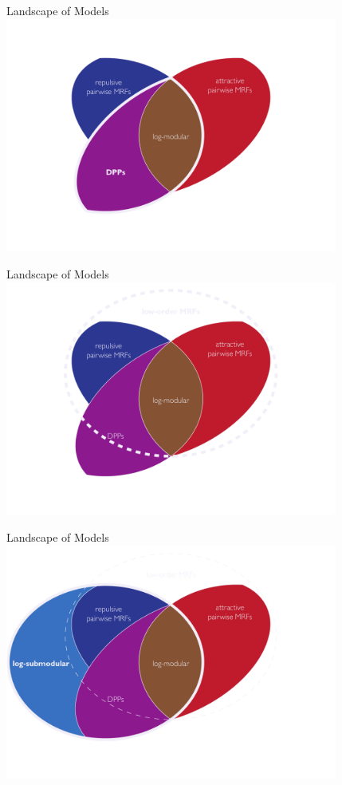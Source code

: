 \begin{frame}{Landscape of Models}
\centering
\includegraphics[width=4.3in]{figures/venn04.pdf}
\end{frame}

\begin{frame}{Landscape of Models}
\centering
\includegraphics[width=4.3in]{figures/venn05.pdf}
\end{frame}

\begin{frame}{Landscape of Models}
\centering
\includegraphics[width=4.3in]{figures/venn06.pdf}
\end{frame}

